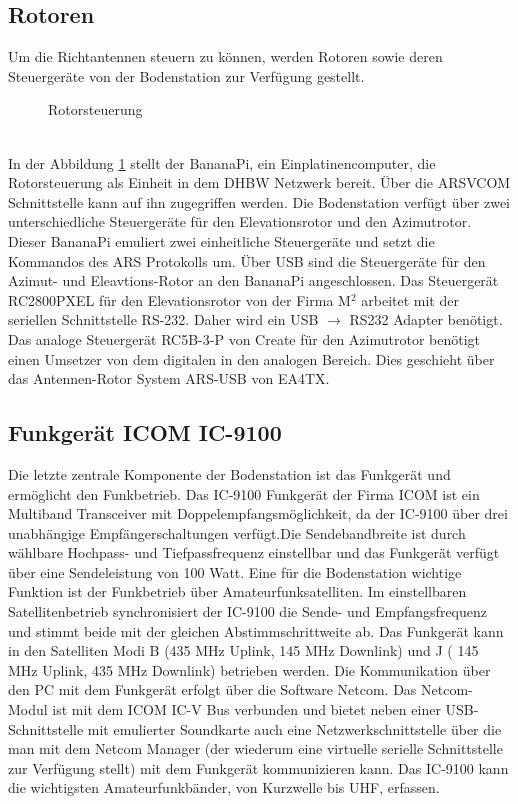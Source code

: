 \subsection{Rotoren}
\label{chap:rotoren}
Um die Richtantennen steuern zu können, werden Rotoren sowie deren Steuergeräte von der Bodenstation zur Verfügung gestellt.
\begin{figure}[h]
	\centering
	
	\caption{Rotorsteuerung}
	\label{fig:azel}
\end{figure}\\
In der Abbildung \ref{fig:azel} stellt der BananaPi, ein Einplatinencomputer, die Rotorsteuerung als Einheit in dem DHBW Netzwerk bereit. Über die 
ARSVCOM Schnittstelle kann auf ihn zugegriffen werden. Die Bodenstation verfügt über zwei unterschiedliche Steuergeräte für den Elevationsrotor und 
den Azimutrotor. Dieser BananaPi emuliert zwei einheitliche Steuergeräte und setzt die Kommandos des ARS Protokolls um. Über USB sind die 
Steuergeräte für den Azimut- und Eleavtions-Rotor an den BananaPi angeschlossen. Das Steuergerät RC2800PXEL für den 
Elevationsrotor von der Firma M$^2$ arbeitet mit der seriellen Schnittstelle RS-232. Daher wird ein USB $\rightarrow$ RS232 Adapter benötigt. Das 
analoge Steuergerät RC5B-3-P von Create für den Azimutrotor benötigt einen Umsetzer von dem digitalen in den analogen Bereich. Dies geschieht über 
das Antennen-Rotor System ARS-USB von EA4TX. 
\clearpage
\subsection{Funkgerät ICOM IC-9100}
\label{chap:funkgerät}

Die letzte zentrale Komponente der Bodenstation ist das Funkgerät und ermöglicht den Funkbetrieb. Das IC-9100 Funkgerät der Firma ICOM ist ein 
Multiband Transceiver mit Doppelempfangsmöglichkeit, da der IC-9100 über drei unabhängige Empfängerschaltungen verfügt.Die Sendebandbreite ist durch 
wählbare Hochpass- und Tiefpassfrequenz einstellbar und das Funkgerät verfügt über eine Sendeleistung von 100 Watt. Eine für die Bodenstation 
wichtige Funktion ist der Funkbetrieb über Amateurfunksatelliten. Im einstellbaren Satellitenbetrieb synchronisiert der IC-9100 die Sende-  und 
Empfangsfrequenz und stimmt beide mit der gleichen Abstimmschrittweite ab. Das Funkgerät kann in den Satelliten Modi B (435 MHz Uplink, 145 MHz 
Downlink) und J ( 145 MHz Uplink, 435 MHz Downlink) betrieben werden. Die Kommunikation über den PC mit dem Funkgerät erfolgt über die Software 
Netcom.  Das Netcom-Modul ist mit dem ICOM IC-V Bus verbunden und bietet neben einer USB-Schnittstelle mit emulierter 
Soundkarte auch eine Netzwerkschnittstelle über die man mit dem Netcom Manager (der wiederum eine virtuelle serielle Schnittstelle zur Verfügung 
stellt) mit dem Funkgerät kommunizieren kann. Das IC-9100 kann die wichtigsten Amateurfunkbänder, von Kurzwelle bis \ac{UHF}, 
erfassen. 

